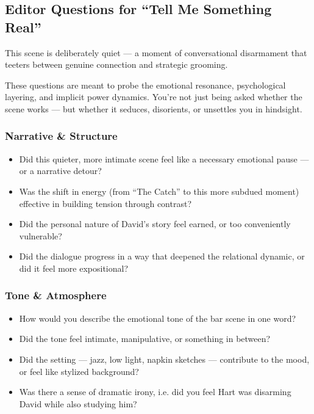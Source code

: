 \medskip

\subsection*{Editor Questions for ``Tell Me Something Real''}

This scene is deliberately quiet — a moment of conversational disarmament that teeters between genuine connection and strategic grooming.

These questions are meant to probe the emotional resonance, psychological layering, and implicit power dynamics.
You're not just being asked whether the scene works — but whether it seduces, disorients, or unsettles you in hindsight.

\subsubsection{Narrative \& Structure}

\begin{itemize}
\item Did this quieter, more intimate scene feel like a necessary emotional pause — or a narrative detour?
\item Was the shift in energy (from “The Catch” to this more subdued moment) effective in building tension through contrast?
\item Did the personal nature of David’s story feel earned, or too conveniently vulnerable?
\item Did the dialogue progress in a way that deepened the relational dynamic, or did it feel more expositional?
\end{itemize}

\subsubsection{Tone \& Atmosphere}

\begin{itemize}
\item How would you describe the emotional tone of the bar scene in one word?
\item Did the tone feel intimate, manipulative, or something in between?
\item Did the setting — jazz, low light, napkin sketches — contribute to the mood, or feel like stylized background?
\item Was there a sense of dramatic irony, i.e. did you feel Hart was disarming David while also studying him?
\end{itemize}

